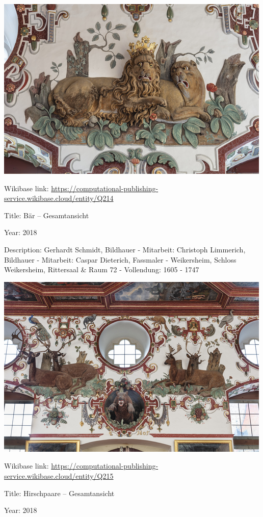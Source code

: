 \documentclass[
  letterpaper,
]{book}
\begin{document}
\includegraphics{paintings_files/figure-pdf/cell-3-output-4.png}

Wikibase link:
\url{https://computational-publishing-service.wikibase.cloud/entity/Q214}

Title: Bär -- Gesamtansicht

Year: 2018

Description: Gerhardt Schmidt, Bildhauer - Mitarbeit: Christoph
Limmerich, Bildhauer - Mitarbeit: Caspar Dieterich, Fassmaler -
Weikersheim, Schloss Weikersheim, Rittersaal \& Raum 72 - Vollendung:
1605 - 1747

\includegraphics{paintings_files/figure-pdf/cell-3-output-6.png}

Wikibase link:
\url{https://computational-publishing-service.wikibase.cloud/entity/Q215}

Title: Hirschpaare -- Gesamtansicht

Year: 2018
\end{document}
